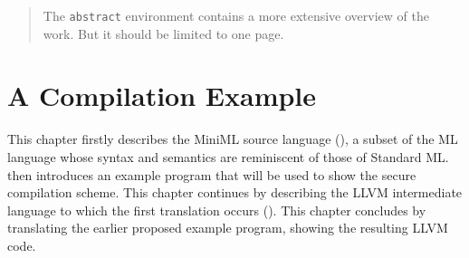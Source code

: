\documentclass[10pt,a4paper,master=cws, masteroption=ai,english,inputenc=utf8]{kulemt}
\begin{document}
\newcommand{\lsttext}[1]{\lstinline{#1}}
\newcommand{\surroundrule}[2][0.3em]{
\leavevmode\raisedrule[#1]{1pt}#2\raisedrule[#1]{1pt}}

\newenvironment{attack}[1]{\par\par\noindent\hspace{-1ex}\surroundrule{#1}\vspace{-0.5em}\par\par}{~\vspace{0.5em}\par\par\noindent\leavevmode\raisedrule[1em]{1pt}\\}



\begin{preface}
\end{preface}

\tableofcontents*

\begin{abstract}
The \texttt{abstract} environment contains a more extensive overview of
the work. But it should be limited to one page.
\end{abstract}

\begin{abstract*}
\end{abstract*}


\mainmatter
\chapter{A Compilation Example\label{chap:ACompilationExample}}

This chapter firstly describes the \mbox{MiniML} source language (), a subset of the ML language whose syntax and semantics are reminiscent of those of Standard ML.
 then introduces an example program that will be used to show the secure compilation scheme.
This chapter continues by describing the LLVM intermediate language to which the first translation occurs ().
This chapter concludes by translating the earlier proposed example program, showing the resulting LLVM code.
\end{document}
